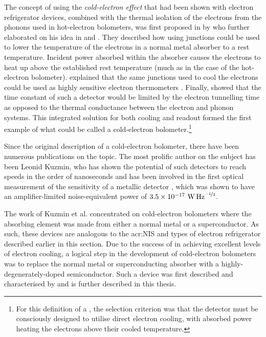 The concept of using the \textit{cold-electron effect} that had been shown with electron refrigerator devices, combined with the thermal isolation of the electrons from the phonons used in hot-electron bolometers, was first proposed in \citeyear{Kuzmin1998} by \citeauthor{Kuzmin1998} who further elaborated on his idea in \citeyear{Kuzmin2000} and \citeyear{Kuzmin2003}. They described how using  junctions could be used to lower the temperature of the electrons in a normal metal absorber to a rest temperature. Incident power absorbed within the absorber causes the electrons to heat up above the established rest temperature (much as in the case of the hot-electron bolometer). \citeauthor{Kuzmin1998} explained that the same  junctions used to cool the electrons could be used as highly sensitive electron thermometers \parencite[as had been used by][]{Nahum1993}. Finally, \citeauthor{Kuzmin1998} showed that the time constant of such a detector would be limited by the electron tunnelling time as opposed to the thermal conductance between the electron and phonon systems. This integrated solution for both cooling and readout formed the first example of what could be called a cold-electron bolometer.\footnote{For this definition of a , the selection criterion was that the detector must be consciously designed to utilise direct electron cooling, with absorbed power heating the electrons above their cooled temperature.}
\par 
Since the original description of a cold-electron bolometer, there have been numerous publications on the topic. The most prolific author on the subject has been Leonid Kuzmin, who has shown the potential of such detectors to reach speeds in the order of nanoseconds \parencite{Kuzmin2004} and has been involved in the first optical measurement of the sensitivity of a metallic  detector \parencite{Otto2013}, which was shown to have an amplifier-limited noise-equivalent power of $3.5 \times 10^{-17}~\mathrm{W\,Hz}^{\nicefrac{-1}{2}}$.
\par 
The work of Kuzmin et al. concentrated on cold-electron bolometers where the absorbing element was made from either a normal metal or a superconductor. As such, these devices are analogous to the \gls{acr:NIS} and  types of electron refrigerator described earlier in this section. Due to the success of \textcite{Prest2011} in achieving excellent levels of electron cooling, a logical step in the development of cold-electron bolometers was to replace the normal metal or superconducting absorber with a highly-degenerately-doped semiconductor. Such a device was first described and characterised by \textcite{Brien2014} and is further described in this thesis.

